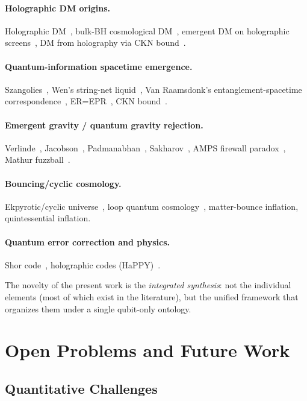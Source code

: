\documentclass[11pt,a4paper]{article}
\begin{document}
\paragraph{Holographic DM origins.} Holographic DM~\cite{Fichet2026}, bulk-BH cosmological DM~\cite{Bulk2022}, emergent DM on holographic screens~\cite{Emergent2017}, DM from holography via CKN bound~\cite{Holo2025}.

\paragraph{Quantum-information spacetime emergence.} Szangolies~\cite{Szangolies2025}, Wen's string-net liquid~\cite{Wen2017}, Van Raamsdonk's entanglement-spacetime correspondence~\cite{VanRaamsdonk2010}, ER=EPR~\cite{Maldacena2013}, CKN bound~\cite{Cohen1999}.

\paragraph{Emergent gravity / quantum gravity rejection.} Verlinde~\cite{Verlinde2010,Verlinde2016}, Jacobson~\cite{Jacobson1995}, Padmanabhan~\cite{Padmanabhan2010}, Sakharov~\cite{Sakharov1967}, AMPS firewall paradox~\cite{AMPS2013}, Mathur fuzzball~\cite{Mathur2005}.

\paragraph{Bouncing/cyclic cosmology.} Ekpyrotic/cyclic universe~\cite{Steinhardt2002}, loop quantum cosmology~\cite{LQC}, matter-bounce inflation, quintessential inflation.

\paragraph{Quantum error correction and physics.} Shor code~\cite{Shor1995}, holographic codes (HaPPY)~\cite{Pastawski2015}.

The novelty of the present work is the \emph{integrated synthesis}: not the individual elements (most of which exist in the literature), but the unified framework that organizes them under a single qubit-only ontology.

\section{Open Problems and Future Work}
\label{sec:open}

\subsection{Quantitative Challenges}
\end{document}
